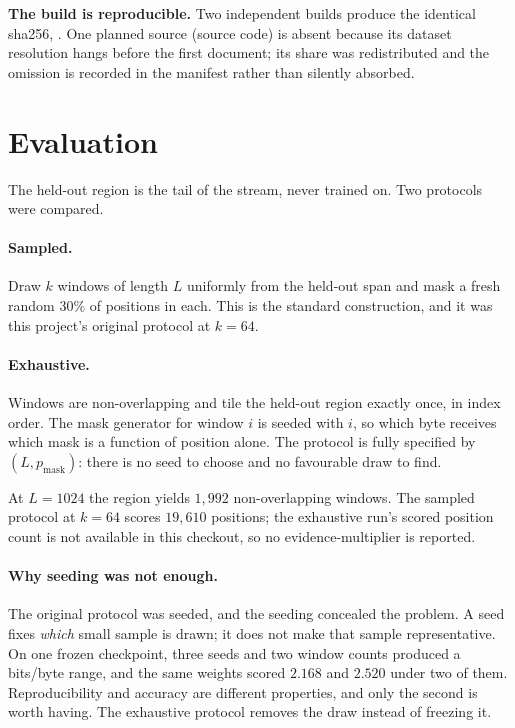 \textbf{The build is reproducible.} Two independent builds produce the identical
sha256, \CorpusSha{}. One planned source (source code) is absent because its
dataset resolution hangs before the first document; its share was redistributed and
the omission is recorded in the manifest rather than silently absorbed.

\section{Evaluation}
\label{sec:exhaustive}

The held-out region is the tail of the stream, never trained on. Two protocols were
compared.

\paragraph{Sampled.} Draw $k$ windows of length $L$ uniformly from the held-out
span and mask a fresh random $30\%$ of positions in each. This is the standard
construction, and it was this project's original protocol at $k = 64$.

\paragraph{Exhaustive.} Windows are non-overlapping and tile the held-out region
exactly once, in index order. The mask generator for window $i$ is seeded with $i$,
so which byte receives which mask is a function of position alone. The protocol is
fully specified by $(L, p_{\text{mask}})$: there is no seed to choose and no
favourable draw to find.

At $L = 1024$ the region yields $1{,}992$ non-overlapping windows. The sampled
protocol at $k = 64$ scores $19{,}610$ positions; the exhaustive run's scored
position count is not available in this checkout, so no evidence-multiplier is
reported.

\paragraph{Why seeding was not enough.} The original protocol was seeded, and the
seeding concealed the problem. A seed fixes \emph{which} small sample is drawn; it
does not make that sample representative. On one frozen checkpoint, three seeds and
two window counts produced a \ProtoOldSpread{} bits/byte range, and the same weights scored
$2.168$ and $2.520$ under two of them. Reproducibility and accuracy are different
properties, and only the second is worth having. The exhaustive protocol removes
the draw instead of freezing it.

